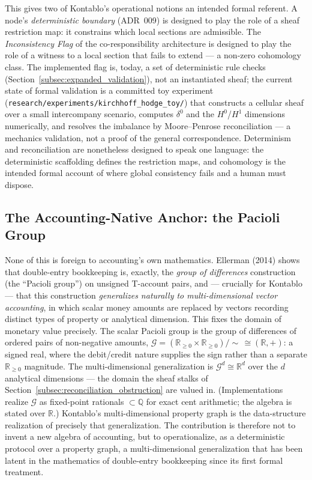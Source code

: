 This gives two of Kontablo's operational notions an intended formal referent. A node's
\emph{deterministic boundary} (ADR~009) is designed to play the role of a sheaf restriction
map: it constrains which local sections are admissible. The \emph{Inconsistency Flag} of
the co-responsibility architecture is designed to play the role of a witness to a local
section that fails to extend --- a non-zero cohomology class. The implemented flag is, today,
a set of deterministic rule checks (Section~\ref{subsec:expanded_validation}), not an
instantiated sheaf; the current state of formal validation is a committed toy experiment
(\texttt{research/experiments/kirchhoff\_hodge\_toy/}) that constructs a cellular sheaf over
a small intercompany scenario, computes $\delta^{0}$ and the $H^{0}$/$H^{1}$ dimensions
numerically, and resolves the imbalance by Moore--Penrose reconciliation --- a mechanics
validation, not a proof of the general correspondence. Determinism and reconciliation are
nonetheless designed to speak one language: the deterministic scaffolding defines the
restriction maps, and cohomology is the intended formal account of where global consistency
fails and a human must dispose.

\subsection{The Accounting-Native Anchor: the Pacioli Group}
\label{subsec:pacioli}
None of this is foreign to accounting's own mathematics. Ellerman (2014) shows that
double-entry bookkeeping is, exactly, the \emph{group of differences} construction (the
``Pacioli group'') on unsigned T-account pairs, and --- crucially for Kontablo --- that this
construction \emph{generalizes naturally to multi-dimensional vector accounting}, in which
scalar money amounts are replaced by vectors recording distinct types of property or
analytical dimension. This fixes the domain of monetary value precisely. The scalar Pacioli
group is the group of differences of ordered pairs of non-negative amounts,
$\mathcal{G} = (\mathbb{R}_{\geq 0} \times \mathbb{R}_{\geq 0})/\!\sim\, \cong (\mathbb{R}, +)$:
a signed real, where the debit/credit nature supplies the sign rather than a separate
$\mathbb{R}_{\geq 0}$ magnitude. The multi-dimensional generalization is $\mathcal{G}^{d}
\cong \mathbb{R}^{d}$ over the $d$ analytical dimensions --- the domain the sheaf stalks of
Section~\ref{subsec:reconciliation_obstruction} are valued in. (Implementations realize
$\mathcal{G}$ as fixed-point rationals $\subset \mathbb{Q}$ for exact cent arithmetic; the
algebra is stated over $\mathbb{R}$.) Kontablo's multi-dimensional property graph is the data-structure
realization of precisely that generalization. The contribution is therefore not to invent a
new algebra of accounting, but to operationalize, as a deterministic protocol over a
property graph, a multi-dimensional generalization that has been latent in the mathematics of
double-entry bookkeeping since its first formal treatment.
